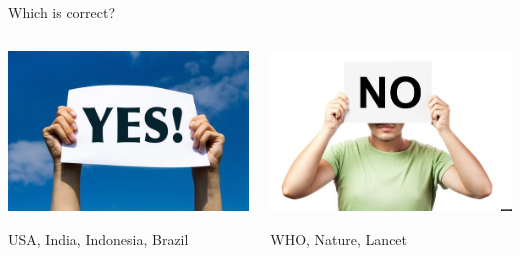 \documentclass{beamer}
\begin{document}
\begin{frame}{Which is correct?}
\begin{columns}
\begin{column}{.5\textwidth}
\includegraphics[width=\linewidth]{images/yes}

USA, India, Indonesia, Brazil 
\end{column}

\begin{column}{.5\textwidth}
\includegraphics[width=\linewidth]{images/no}

WHO, Nature, Lancet
\end{column}
\end{columns}

\end{frame}
\end{document}
